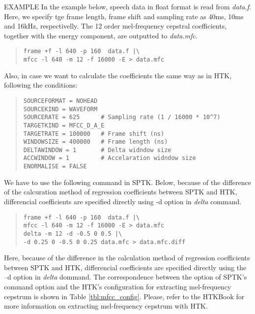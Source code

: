 \begin{qsection}{EXAMPLE}
In the example below, speech data in float format is read from
{\em data.f}. 
Here, we specify tge frame length, frame shift and sampling rate as
40ms, 10ms and 16kHz, respectivelly. The 12 order mel-frequency
cepstral coefficients, together with the energy component, are
outputted to {\em data.mfc}.
\begin{quote}
  \verb!frame +f -l 640 -p 160  data.f |\                        ! \\
  \verb!mfcc -l 640 -m 12 -f 16000 -E > data.mfc                  ! \\
\end{quote}

Also, in case we want to calculate the coefficients the same way as in
HTK, following the conditions:
\begin{quote}
  \verb!SOURCEFORMAT = NOHEAD! \\
  \verb!SOURCEKIND = WAVEFORM ! \\
  \verb!SOURCERATE = 625      # Sampling rate (1 / 16000 * 10^7)!\\
  \verb!TARGETKIND = MFCC_D_A_E ! \\
  \verb!TARGETRATE = 100000   # Frame shift (ns)! \\
  \verb!WINDOWSIZE = 400000   # Frame length (ns)! \\
  \verb!DELTAWINDOW = 1       # Delta widndow size! \\
  \verb!ACCWINDOW = 1         # Accelaration widndow size! \\
  \verb!ENORMALISE = FALSE ! \\
\end{quote}
We have to use the following command in SPTK. Below, because of the difference of the
calcuration method of regression coefficients between SPTK and HTK,
differencial coefficients are specified directly using -d option in
{\em delta} command. 
\begin{quote}
  \verb!frame +f -l 640 -p 160  data.f |\                        ! \\
  \verb!mfcc -l 640 -m 12 -f 16000 -E > data.mfc                  ! \\
  \verb!delta -m 12 -d -0.5 0 0.5 |\ ! \\
  \verb!-d 0.25 0 -0.5 0 0.25 data.mfc > data.mfc.diff! \\
\end{quote}
Here, because of the difference in the calculation method of
regression coefficients between SPTK and HTK, differencial
coefficients are specified directly using the --d option in {\em
  delta} dommand.
The correspondence between the option of SPTK's command option and the
HTK's configuration for extracting mel-frequency cepstrum is shown in Table
\ref{tbl:mfcc_config}. Please, refer to the HTKBook for more
information on extracting mel-frequency cepstrum with HTK.


\end{qsection}
